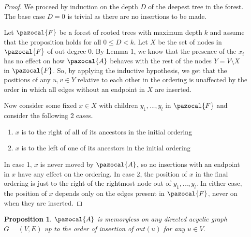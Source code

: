 \documentclass{article}
\newtheorem{proposition}{Proposition}
\begin{document}
\begin{proof}
We proceed by induction on the depth $D$ of the deepest tree in the forest. The base case $D=0$ is trivial as there are no insertions to be made.

Let $\pazocal{F}$ be a forest of rooted trees with maximum depth $k$ and assume that the proposition holds for all $0 \leq D < k$. Let $X$ be the set of nodes in $\pazocal{F}$ of out degree 0. By Lemma 1, we know that the presence of the $x_i$ has no effect on how $\pazocal{A}$ behaves with the rest of the nodes $Y = V \setminus X$ in $\pazocal{F}$. So, by applying the inductive hypothesis, we get that the positions of any $u,v \in Y$ relative to each other in the ordering is unaffected by the order in which all edges without an endpoint in $X$ are inserted.

Now consider some fixed $x \in X$ with children $y_1,...,y_l$ in $\pazocal{F}$ and consider the following 2 cases.

\begin{enumerate}
    \item $x$ is to the right of all of its ancestors in the initial ordering
    \item $x$ is to the left of one of its ancestors in the initial ordering
\end{enumerate}

In case 1, $x$ is never moved by $\pazocal{A}$, so no insertions with an endpoint in $x$ have any effect on the ordering. In case 2, the position of $x$ in the final ordering is just to the right of the rightmost node out of $y_1,...,y_l$. In either case, the position of $x$ depends only on the edges present in $\pazocal{F}$, never on when they are inserted.
\end{proof}

\begin{proposition}
$\pazocal{A}$ is memoryless on any directed acyclic graph $G=(V,E)$ up to the order of insertion of $out(u)$ for any $u \in V$.
\end{proposition}
\end{document}
